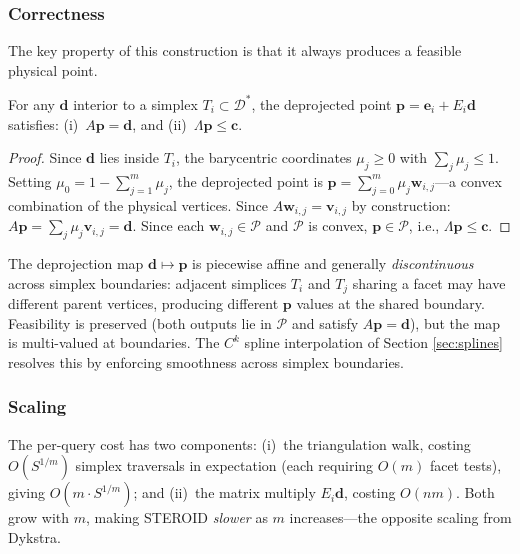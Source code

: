 \documentclass[review,onefignum,onetabnum]{./SIAM_template/siamart171218}
\begin{document}
\subsubsection{Correctness}

The key property of this construction is that it always produces a feasible
physical point.

\begin{theorem}
	\label{thm:feasibility}
	For any $\mathbf{d}$ interior to a simplex $T_i \subset \mathcal{D}^*$, the
	deprojected point $\mathbf{p} = \mathbf{e}_i + E_i \mathbf{d}$ satisfies:
	(i)~$A\mathbf{p} = \mathbf{d}$, and
	(ii)~$\Lambda\mathbf{p} \leq \mathbf{c}$.
\end{theorem}
\begin{proof}
	Since $\mathbf{d}$ lies inside $T_i$, the barycentric coordinates
	$\mu_j \geq 0$ with $\sum_j \mu_j \leq 1$.  Setting
	$\mu_0 = 1 - \sum_{j=1}^m \mu_j$, the deprojected point is
	$\mathbf{p} = \sum_{j=0}^m \mu_j \mathbf{w}_{i,j}$---a convex combination
	of the physical vertices.
	Since $A\mathbf{w}_{i,j} = \mathbf{v}_{i,j}$ by construction:
	$A\mathbf{p} = \sum_j \mu_j \mathbf{v}_{i,j} = \mathbf{d}$.
	Since each $\mathbf{w}_{i,j} \in \mathcal{P}$ and $\mathcal{P}$ is convex,
	$\mathbf{p} \in \mathcal{P}$, i.e., $\Lambda\mathbf{p} \leq \mathbf{c}$.
\end{proof}

\begin{remark}
	The deprojection map $\mathbf{d} \mapsto \mathbf{p}$ is piecewise affine and
	generally \emph{discontinuous} across simplex boundaries: adjacent simplices
	$T_i$ and $T_j$ sharing a facet may have different parent vertices, producing
	different $\mathbf{p}$ values at the shared boundary.  Feasibility is preserved
	(both outputs lie in $\mathcal{P}$ and satisfy $A\mathbf{p} = \mathbf{d}$), but
	the map is multi-valued at boundaries.  The $C^k$ spline interpolation of
	Section \ref{sec:splines} resolves this by enforcing smoothness across simplex
	boundaries.
\end{remark}

\subsubsection{Scaling}

The per-query cost has two components:
(i)~the triangulation walk, costing $O(S^{1/m})$ simplex traversals in
expectation (each requiring $O(m)$ facet tests), giving $O(m \cdot S^{1/m})$;
and (ii)~the matrix multiply $E_i \mathbf{d}$, costing $O(nm)$.
Both grow with $m$, making STEROID \emph{slower} as $m$ increases---the
opposite scaling from Dykstra.
\end{document}
